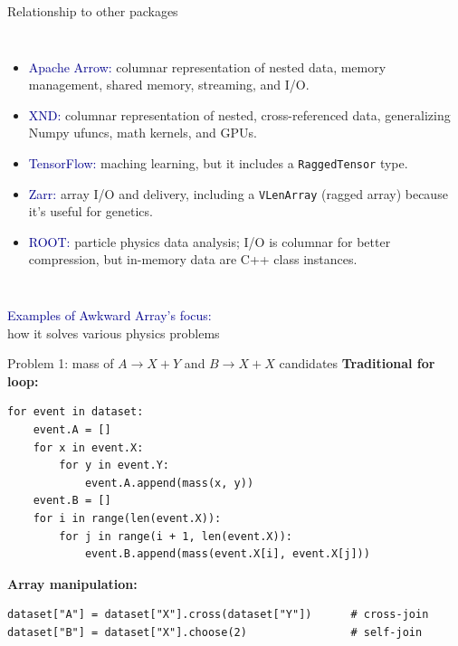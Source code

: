 \documentclass[aspectratio=169]{beamer}
\begin{document}
\begin{frame}{Relationship to other packages}
\large
\vspace{0.4 cm}
\begin{columns}
\begin{itemize}\setlength{\itemsep}{0.25 cm}
\item \textcolor{darkblue}{Apache Arrow:} columnar representation of nested data, memory management, shared memory, streaming, and I/O.

\item \textcolor{darkblue}{XND:} columnar representation of nested, cross-referenced data, generalizing Numpy ufuncs, math kernels, and GPUs.

\item \textcolor{darkblue}{TensorFlow:} maching learning, but it includes a {\tt RaggedTensor} type.

\item \textcolor{darkblue}{Zarr:} array I/O and delivery, including a {\tt VLenArray} (ragged array) because it's useful for genetics.

\item \textcolor{darkblue}{ROOT:} particle physics data analysis; I/O is columnar for better compression, but in-memory data are C++ class instances.
\end{itemize}

\vspace{0.4 cm}
\end{columns}
\end{frame}

\begin{frame}{}
\LARGE
\vspace{1 cm}
\begin{center}
\textcolor{darkblue}{Examples of Awkward Array's focus:} \\ how it solves various physics problems
\end{center}
\end{frame}

\begin{frame}[fragile]{Problem 1: mass of $A \to X + Y$ and $B \to X + X$ candidates}
\vspace{0.5 cm}
{\bf Traditional for loop:} 
\small
\begin{verbatim}
for event in dataset:
    event.A = []
    for x in event.X:
        for y in event.Y:
            event.A.append(mass(x, y))
    event.B = []
    for i in range(len(event.X)):
        for j in range(i + 1, len(event.X)):
            event.B.append(mass(event.X[i], event.X[j]))
\end{verbatim}
\normalsize

\vspace{0.5 cm}
{\bf Array manipulation:} 
\small
\begin{verbatim}
dataset["A"] = dataset["X"].cross(dataset["Y"])      # cross-join
dataset["B"] = dataset["X"].choose(2)                # self-join
\end{verbatim}
\end{frame}
\end{document}
